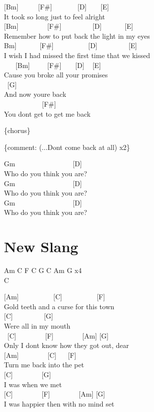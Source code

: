 \documentclass[
  letterpaper,
  twoside=false]{scrbook}
\begin{document}
{[}Bm{]} ~ ~ ~ {[}F\#{]} ~ ~ ~ ~ {[}D{]} ~ ~ {[}E{]}\\
It took so long just to feel alright\\
{[}Bm{]} ~ ~ ~ ~ ~{[}F\#{]} ~ ~ ~ ~ ~ {[}D{]} ~ ~ ~ ~{[}E{]}\\
Remember how to put back the light in my eyes\\
\hspace*{0.333em}{[}Bm{]} ~ ~ ~ ~{[}F\#{]} ~ ~ ~ ~ ~ ~{[}D{]} ~ ~ ~ ~ ~
{[}E{]}\\
I wish I had missed the first time that we kissed\\
\hspace*{0.333em} ~ ~ {[}Bm{]} ~ ~ ~{[}F\#{]} ~ ~ {[}D{]} ~ {[}E{]}\\
\textquotesingle Cause you broke all your promises\\
\hspace*{0.333em} ~{[}G{]}\\
And now you\textquotesingle re back\\
\hspace*{0.333em} ~ ~ ~ ~ ~ ~ ~{[}F\#{]}\\
You don\textquotesingle t get to get me back

\{chorus\}

\{comment: (...Don\textquotesingle t come back at all) x2\}

Gm ~ ~ ~ ~ ~ ~ ~ ~ ~ ~{[}D{]}\\
Who do you think you are?\\
Gm ~ ~ ~ ~ ~ ~ ~ ~ ~ ~{[}D{]}\\
Who do you think you are?\\
Gm ~ ~ ~ ~ ~ ~ ~ ~ ~ ~{[}D{]}\\
Who do you think you are?

\hypertarget{new-slang}{%
\chapter{New Slang}\label{new-slang}}

Am C F C G C Am G x4\\
C

{[}Am{]} ~ ~ ~ ~ ~ ~{[}C{]} ~ ~ ~ ~ ~ ~{[}F{]}\\
Gold teeth and a curse for this town\\
{[}C{]} ~ ~ ~ ~ ~ {[}G{]}\\
Were all in my mouth\\
\hspace*{0.333em} ~{[}C{]} ~ ~ ~ ~ ~{[}F{]} ~ ~ ~ ~ ~{[}Am{]} {[}G{]}\\
Only I don\textquotesingle t know how they got out, dear\\
{[}Am{]} ~ ~ ~ ~ ~{[}C{]} ~ ~{[}F{]}\\
Turn me back into the pet\\
{[}C{]} ~ ~ ~ ~ ~{[}G{]}\\
I was when we met\\
{[}C{]} ~ ~ ~ ~ ~{[}F{]} ~ ~ ~ ~ ~{[}Am{]} {[}G{]}\\
I was happier then with no mind set
\end{document}
